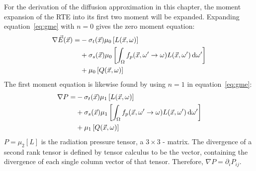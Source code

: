 For the derivation of the diffusion approximation in this chapter, the moment expansion of the RTE into its first two moment will be expanded. Expanding equation~\ref{eq:gme} with $n=0$ gives the zero moment equation:
\begin{align}
\nonumber
\nabla\vec{E}(\vec{x})=&
-\sigma_t(\vec{x})\mu_0\left[L(\vec{x}, \omega)\right]
\\
\label{eq:p1_zero}
&+ \sigma_s(\vec{x})\mu_0\left[\int_{\Omega}f_p(\vec{x}, \omega'\rightarrow\omega)L(\vec{x}, \omega')\,\mathrm{d}\omega'\right] 
\\
\nonumber
&+ \mu_0\left[Q(\vec{x}, \omega)\right]
\end{align}
The first moment equation is likewise found by using $n=1$ in equation~\ref{eq:gme}:
\begin{align}
\nonumber
\nabla P =&
-\sigma_t(\vec{x})\mu_1\left[L(\vec{x}, \omega)\right]
\\ &
\label{eq:p1_firstme}
+\sigma_s(\vec{x})\mu_1\left[\int_{\Omega}f_p(\vec{x}, \omega'\rightarrow\omega)L(\vec{x}, \omega')\,\mathrm{d}\omega'\right]
\\ &
\nonumber
+ \mu_1\left[Q(\vec{x}, \omega)\right]
\end{align}
$P=\mu_2[L]$ is the radiation pressure tensor, a $3\times3$ - matrix. The divergence of a second rank tensor is defined by tensor calculus to be the vector, containing the divergence of each single column vector of that tensor. Therefore, $\nabla P = \partial_i P_{ij}$.

